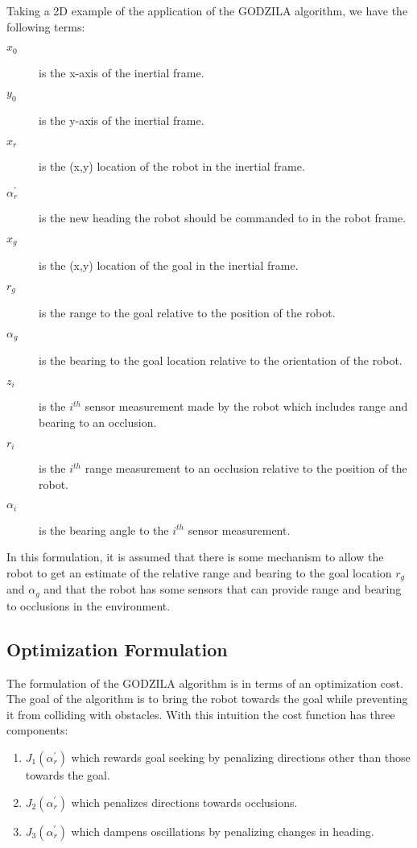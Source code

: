 Taking a 2D example of the application of the GODZILA algorithm, we have the following terms:

\begin{description}
	\item[$x_0$] is the x-axis of the inertial frame.
	\item[$y_0$] is the y-axis of the inertial frame.
	\item[$x_r$] is the (x,y) location of the robot in the inertial frame.
	\item[$\alpha_r^\prime$] is the new heading the robot should be commanded to in the robot frame.
	\item[$x_g$] is the (x,y) location of the goal in the inertial frame.
	\item[$r_g$] is the range to the goal relative to the position of the robot.
	\item[$\alpha_g$] is the bearing to the goal location relative to the orientation of the robot.
	\item[$z_i$] is the $i^{th}$ sensor measurement made by the robot which includes range and bearing to an occlusion.
	\item[$r_i$] is the $i^{th}$ range measurement to an occlusion relative to the position of the robot.
	\item[$\alpha_i$] is the bearing angle to the $i^{th}$ sensor measurement.
\end{description}

In this formulation, it is assumed that there is some mechanism to allow the robot to get an estimate of the relative
range and bearing to the goal location $r_g$ and $\alpha_g$ and that the robot has some sensors that can provide range
and bearing to occlusions in the environment.

\subsection{Optimization Formulation}\label{subsec:navoptimization}
The formulation of the GODZILA algorithm is in terms of an optimization cost. The goal of the algorithm is to bring the robot
towards the goal while preventing it from colliding with obstacles. With this intuition the cost function has three components:

\begin{enumerate}
	\item $J_1(\alpha_r^\prime)$ which rewards goal seeking by penalizing directions other than those towards the goal.
	\item $J_2(\alpha_r^\prime)$ which penalizes directions towards occlusions.
	\item $J_3(\alpha_r^\prime)$ which dampens oscillations by penalizing changes in heading.
\end{enumerate}


